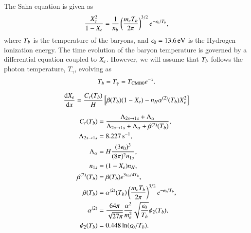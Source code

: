 
The Saha equation is given as 
\begin{equation} \label{eq:M2:theory:saha_equation}
    \frac{X_e^2}{1-X_e} = \frac{1}{n_b} \left( \frac{m_e T_b}{2\pi} \right)^{3/2} e^{-\epsilon_0 / T_b},
\end{equation}
where $T_b$ is the temperature of the baryons, and $\epsilon_0=13.6\,\mathrm{eV}$ is the Hydrogen ionization energy. The time evolution of the baryon temperature is governed by a differential equation coupled to $X_e$. However, we will assume that $T_b$ follows the photon temperature, $T_\gamma$, evolving as 
\begin{equation}
    T_b = T_\gamma = T_\mathrm{CMB0} e^{-x}.
\end{equation}



\begin{equation} \label{eq:M2:theory:Xe_peebles_ODE}
    \dv{X_e}{x} = \frac{C_r(T_b)}{H}\left[ \beta(T_b)(1-X_e) - n_H \alpha^{(2)}(T_b) X_e^2  \right]
\end{equation}

\begin{subequations} \label{eq:M2:theory:peebles:ODE_all_individual_terms}
    \begin{align}
        C_r(T_b) &= \frac{\Lambda_{2s\to1s} + \Lambda_\alpha}{\Lambda_{2s\to1s} + \Lambda_\alpha + \beta^{(2)}(T_b)}, \label{eq:M2:theory:peebles:C_r} \\
        \Lambda_{2s\to1s} &= 8.227\,\mathrm{s^{-1}}, \label{eq:M2:theory:peebles:Lambda_2s_1s} \\
        \Lambda_\alpha &= H \frac{(3\epsilon_0)^3}{(8\pi)^2 n_{1s}}, \label{eq:M2:theory:peebles:Lambda_alpha} \\
        n_{1s} &= (1-X_e) n_H , \label{eq:M2:theory:peebles:n_1s} \\
        \beta^{(2)}(T_b) &= \beta(T_b) e^{3\epsilon_0/4T_b}, \label{eq:M2:theory:peebles:beta2} \\
        \beta(T_b) &= \alpha^{(2)}(T_b) \left( \frac{m_e T_b}{2\pi} \right)^{3/2} e^{-\epsilon_0/T_b}, \label{eq:M2:theory:peebles:beta} \\
        \alpha^{(2)} &= \frac{64\pi}{\sqrt{27\pi}} \frac{\alpha^2}{m_e^2} \sqrt{\frac{\epsilon_0}{T_b}} \phi_2(T_b), \label{eq:M2:theory:peebles:alpha_2} \\
        \phi_2(T_b) &= 0.448\ln(\epsilon_0/T_b). \label{eq:M2:theory:peebles:phi_2} 
    \end{align}
\end{subequations}
    

